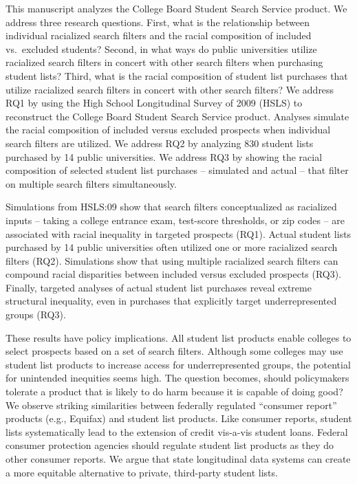 \documentclass[
  12pt,
]{article}
\begin{document}
This manuscript analyzes the College Board Student Search Service product. We address three research questions. First, what is the relationship between individual racialized search filters and the racial composition of included vs.~excluded students? Second, in what ways do public universities utilize racialized search filters in concert with other search filters when purchasing student lists? Third, what is the racial composition of student list purchases that utilize racialized search filters in concert with other search filters? We address RQ1 by using the High School Longitudinal Survey of 2009 (HSLS) to reconstruct the College Board Student Search Service product. Analyses simulate the racial composition of included versus excluded prospects when individual search filters are utilized. We address RQ2 by analyzing 830 student lists purchased by 14 public universities. We address RQ3 by showing the racial composition of selected student list purchases -- simulated and actual -- that filter on multiple search filters simultaneously.

Simulations from HSLS:09 show that search filters conceptualized as racialized inputs -- taking a college entrance exam, test-score thresholds, or zip codes -- are associated with racial inequality in targeted prospects (RQ1). Actual student lists purchased by 14 public universities often utilized one or more racialized search filters (RQ2). Simulations show that using multiple racialized search filters can compound racial disparities between included versus excluded prospects (RQ3). Finally, targeted analyses of actual student list purchases reveal extreme structural inequality, even in purchases that explicitly target underrepresented groups (RQ3).

These results have policy implications. All student list products enable colleges to select prospects based on a set of search filters. Although some colleges may use student list products to increase access for underrepresented groups, the potential for unintended inequities seems high. The question becomes, should policymakers tolerate a product that is likely to do harm because it is capable of doing good? We observe striking similarities between federally regulated ``consumer report'' products (e.g., Equifax) and student list products. Like consumer reports, student lists systematically lead to the extension of credit vis-a-vis student loans. Federal consumer protection agencies should regulate student list products as they do other consumer reports. We argue that state longitudinal data systems can create a more equitable alternative to private, third-party student lists.
\end{document}
